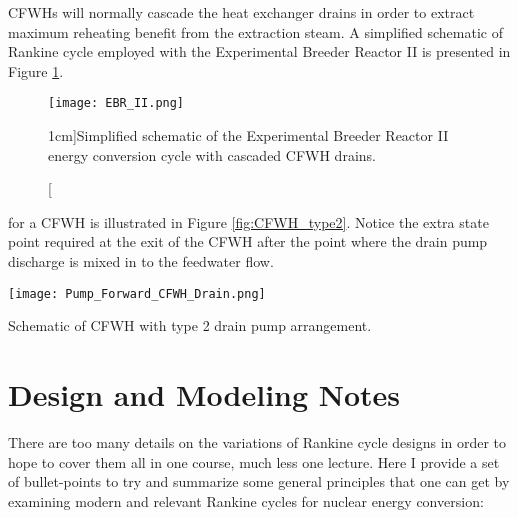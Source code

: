  CFWHs will normally cascade the heat exchanger drains in order to extract maximum reheating benefit from the extraction steam.  A simplified schematic of Rankine cycle employed with the Experimental Breeder Reactor II is presented in Figure \ref{fig:EBRII}.\cite{koch2008experimental}
\begin{figure}
\texttt{[image: EBR\_II.png]}
\caption[][1cm]{Simplified schematic of the Experimental Breeder Reactor II energy conversion cycle with cascaded CFWH drains.}
\label{fig:EBRII}
\end{figure}


 for a CFWH is illustrated in Figure \ref{fig:CFWH_type2}.  Notice the extra state point required at the exit of the CFWH after the point where the drain pump discharge is mixed in to the feedwater flow.  
\begin{marginfigure}
\texttt{[image: Pump\_Forward\_CFWH\_Drain.png]}
\caption{Schematic of CFWH with type 2 drain pump arrangement.}
\label{fig:CFWH_type2}
\end{marginfigure}




\section{Design and Modeling Notes}
There are too many details on the variations of Rankine cycle designs in order to hope to cover them all in one course, much less one lecture.  Here I provide a set of bullet-points to try and summarize some general principles that one can get by examining modern and relevant Rankine cycles for nuclear energy conversion:

